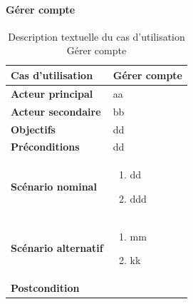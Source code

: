         \paragraph[Gérer compte]{Gérer compte}
        \begin{longtable}{p{4cm} p{9cm}}
            \caption{Description textuelle du cas d’utilisation Gérer compte}
            \label{table:usecaseGereCompte}
            \\\hline\hline
                \textbf{Cas d’utilisation} & \textbf{Gérer compte}
            \\\hline\hline
                    \textbf{Acteur principal} & aa
                \\
                    \textbf{Acteur secondaire} & bb
                \\
                    \textbf{Objectifs} & dd
                \\
                    \textbf{Préconditions} & dd
                \\
                \textbf{Scénario nominal} &
                    \begin{enumerate}[leftmargin=*]
                        \item dd
                        \item ddd
                    \end{enumerate}
                \\
                \textbf{Scénario alternatif} &
                    \begin{enumerate}[leftmargin=*]
                        \item mm
                        \item kk
                    \end{enumerate}
                \\
                \textbf{Postcondition}
            \\\bottomrule
        \end{longtable}

